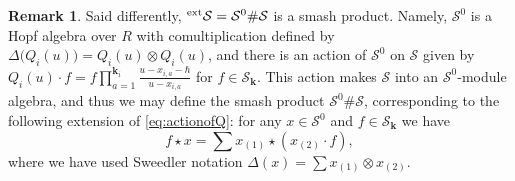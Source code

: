 \documentclass[11pt,reqno]{amsart}
\renewcommand{\mathbf}{\mathbold}
\numberwithin{equation}{section}
\theoremstyle{definition}
\newtheorem{Remark}[equation]{Remark}
\newcommand{\cS}{\mathcal{S}}
\newcommand{\bk}{\mathbf{k}}
\newcommand{\leftexp}[2]{\vphantom{#2}^{#1} #2}
\newcommand{\base}{R}
\newcommand{\shu}{\cS}
\newcommand{\extshu}{\leftexp{\mathrm{ext}}{\cS}}
\newcommand{\shuzero}{\cS^0}
\newcommand{\Qvar}{Q}
\begin{document}
\begin{Remark}
    Said differently, $\extshu = \shuzero \# \shu$ is a smash product.  Namely, $\shuzero$ is a Hopf algebra over $\base$ with comultiplication defined by $\Delta\big( \Qvar_i(u) \big) = \Qvar_i(u) \otimes \Qvar_i(u)$, and there is an action of $\shuzero$ on $\shu$ given by $ \Qvar_i(u) \cdot f = f \prod_{a=1}^{\bk_i} \frac{u-x_{i,a} - \hbar}{u-x_{i,a}}$ for $f \in \shu_\bk$. This action makes $\shu$ into an $\shuzero$-module algebra, and thus we may define the smash product $\shuzero \# \shu$, corresponding to the following extension of \eqref{eq:actionofQ}: for any $x \in \shuzero$ and $f\in \shu_\bk$ we have
    $$
    f \star x = \sum x_{(1)} \star (x_{(2)} \cdot f),
    $$
    where we have used Sweedler notation $\Delta(x) = \sum x_{(1)} \otimes x_{(2)}$.
\end{Remark}
\end{document}
